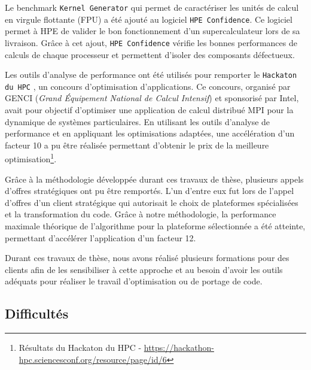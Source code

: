         Le benchmark \verb|Kernel Generator| qui permet de caractériser les unités de calcul en virgule flottante (FPU) a été ajouté au logiciel \verb|HPE Confidence|. Ce logiciel permet à HPE de valider le bon fonctionnement d'un supercalculateur lors de sa livraison. Grâce à cet ajout, \verb|HPE Confidence| vérifie les bonnes performances de calculs de chaque processeur et permettent d’isoler des composants défectueux. 

        Les outils d'analyse de performance ont été utilisés pour remporter le \verb|Hackaton du HPC| \cite{Hackaton}, un concours d’optimisation d’applications. Ce concours, organisé par GENCI (\textit{Grand Équipement National de Calcul Intensif}) et sponsorisé par Intel, avait pour objectif d’optimiser une application de calcul distribué MPI pour la dynamique de systèmes particulaires. En utilisant les outils d'analyse de performance et en appliquant les optimisations adaptées, une accélération d’un facteur 10 a pu être réalisée permettant d'obtenir le prix de la meilleure optimisation\footnote{Résultats du Hackaton du HPC - \url{https://hackathon-hpc.sciencesconf.org/resource/page/id/6}}.
        
        Grâce à la méthodologie développée durant ces travaux de thèse, plusieurs appels d'offres stratégiques ont pu être remportés. L’un d’entre eux fut lors de l’appel d’offres d’un client stratégique qui autorisait le choix de plateformes spécialisées et la transformation du code. Grâce à notre méthodologie, la performance maximale théorique de l’algorithme pour la plateforme sélectionnée a été atteinte, permettant d'accélérer l'application d'un facteur 12. 
        
        Durant ces travaux de thèse, nous avons réalisé plusieurs formations pour des clients afin de les sensibiliser à cette approche et au besoin d’avoir les outils adéquats pour réaliser le travail d’optimisation ou de portage de code.

 
    \subsection{Difficultés}
        
        
